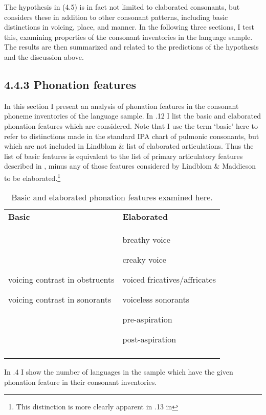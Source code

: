   The hypothesis in (4.5) is in fact not limited to elaborated consonants, but considers these in addition to other consonant patterns, including basic distinctions in voicing, place, and manner. In the following three sections, I test this, examining properties of the consonant inventories in the language sample. The results are then summarized and related to the predictions of the hypothesis and the discussion above.


\subsection{4.4.3 Phonation features}

  In this section I present an analysis of phonation features in the consonant phoneme inventories of the language sample. In .12 I list the basic and elaborated phonation features which are considered. Note that I use the term ‘basic’ here to refer to distinctions made in the standard IPA chart of pulmonic consonants, but which are not included in Lindblom \&  list of elaborated articulations. Thus the list of basic features is equivalent to the list of primary articulatory features described in , minus any of those features considered by Lindblom \& Maddieson to be elaborated.\footnote{ \textrm{This distinction is more clearly apparent in .13 in }}






\begin{table}
\begin{tabularx}{\textwidth}{XX}
\lsptoprule

\textbf{Basic} & \textbf{Elaborated}\\
voicing contrast in obstruents

voicing contrast in sonorants & breathy voice

creaky voice

voiced fricatives/affricates

voiceless sonorants

pre-aspiration

post-aspiration\\
\lspbottomrule
\end{tabularx}
\caption{\label{4.12}Basic and elaborated phonation features examined here.}
\end{table}




  In .4 I show the number of languages in the sample which have the given phonation feature in their consonant inventories.





